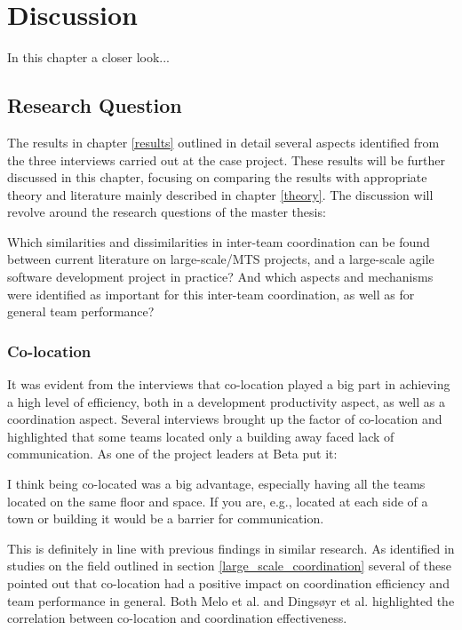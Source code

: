 \chapter{Discussion}
\label{disc}

\minitoc

In this chapter a closer look...
\newpage

\section{Research Question}

The results in chapter \ref{results} outlined in detail several aspects identified from the three interviews carried out at the case project. These results will be further discussed in this chapter, focusing on comparing the results with appropriate theory and literature mainly described in chapter \ref{theory}. The discussion will revolve around the research questions of the master thesis:

\begin{fancyquotes}
Which similarities and dissimilarities in inter-team coordination can be found between current literature on large-scale/MTS projects, and a large-scale agile software development project in practice? And which aspects and mechanisms were identified as important for this inter-team coordination, as well as for general team performance?
\end{fancyquotes}

\subsection{Co-location}

It was evident from the interviews that co-location played a big part in achieving a high level of efficiency, both in a development productivity aspect, as well as a coordination aspect. Several interviews brought up the factor of co-location and highlighted that some teams located only a building away faced lack of communication. As one of the project leaders at Beta put it:

\begin{fancyquotes}
I think being co-located was a big advantage, especially having all the teams located on the same floor and space. If you are, e.g., located at each side of a town or building it would be a barrier for communication.
\end{fancyquotes}

This is definitely in line with previous findings in similar research. As identified in studies on the field outlined in section \ref{large_scale_coordination} several of these pointed out that co-location had a positive impact on coordination efficiency and team performance in general. Both Melo et al. \cite{Melo2013} and Dingsøyr et al. \cite{Dingsoyr2013c} highlighted the correlation between co-location and coordination effectiveness.

